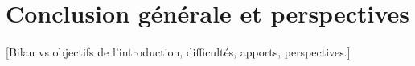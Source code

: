 \chapter*{Conclusion générale et perspectives}
[Bilan vs objectifs de l'introduction, difficultés, apports, perspectives.]
